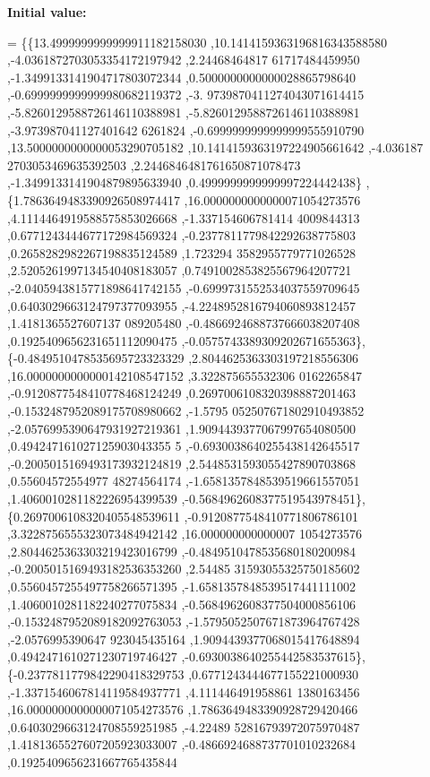 {\bfseries Initial value\+:}
\begin{DoxyCode}
= \{\{13.4999999999999911182158030 ,10.1414159363196816343588580 ,-4.0361872703053354172197942 ,2.24468464817
      61717484459950 ,-1.3499133141904717803072344 ,0.5000000000000028865798640 ,-0.6999999999999980682119372 ,-3.
      9739870411274043071614415 ,-5.8260129588726146110388981 ,-5.8260129588726146110388981 ,-3.973987041127401642
      6261824 ,-0.6999999999999999555910790 ,13.5000000000000053290705182 ,10.1414159363197224905661642 ,-4.036187
      2703053469635392503 ,2.2446846481761650871078473 ,-1.3499133141904879895633940 ,0.4999999999999997224442438\}
      ,
\{1.7863649483390926508974417 ,16.0000000000000071054273576 ,4.1114464919588575853026668 ,-1.337154606781414
      4009844313 ,0.6771243444677172984569324 ,-0.2377811779842292638775803 ,0.2658282982267198835124589 ,1.723294
      3582955779771026528 ,2.5205261997134540408183057 ,0.7491002853825567964207721 ,-2.0405943815771898641742155 
      ,-0.6999731552534037559709645 ,0.6403029663124797377093955 ,-4.2248952816794060893812457 ,1.4181365527607137
      089205480 ,-0.4866924688737666038207408 ,0.1925409656231651112090475 ,-0.0575743389309202671655363\},
\{-0.4849510478535695723323329 ,2.8044625363303197218556306 ,16.0000000000000142108547152 ,3.322875655532306
      0162265847 ,-0.9120877548410778468124249 ,0.2697006108320398887201463 ,-0.1532487952089175708980662 ,-1.5795
      052507671802910493852 ,-2.0576995390647931927219361 ,1.9094439377067997654080500 ,0.494247161027125903043355
      5 ,-0.6930038640255438142645517 ,-0.2005015169493173932124819 ,2.5448531593055427890703868 ,0.55604572554977
      48274564174 ,-1.6581357848539519661557051 ,1.4060010281182226954399539 ,-0.5684962608377519543978451\},
\{0.2697006108320405548539611 ,-0.9120877548410771806786101 ,3.3228756555323073484942142 ,16.000000000000007
      1054273576 ,2.8044625363303219423016799 ,-0.4849510478535680180200984 ,-0.2005015169493182536353260 ,2.54485
      31593055325750185602 ,0.5560457255497758266571395 ,-1.6581357848539517441111002 ,1.4060010281182240277075834
       ,-0.5684962608377504000856106 ,-0.1532487952089182092763053 ,-1.5795052507671873964767428 ,-2.0576995390647
      923045435164 ,1.9094439377068015417648894 ,0.4942471610271230719746427 ,-0.6930038640255442583537615\},
\{-0.2377811779842290418329753 ,0.6771243444677155221000930 ,-1.3371546067814119584937771 ,4.111446491958861
      1380163456 ,16.0000000000000071054273576 ,1.7863649483390928729420466 ,0.6403029663124708559251985 ,-4.22489
      52816793972075970487 ,1.4181365527607205923033007 ,-0.4866924688737701010232684 ,0.1925409656231667765435844

\end{DoxyCode}
